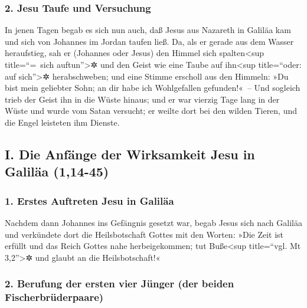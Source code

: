 \hypertarget{jesu-taufe-und-versuchung}{%
\subsubsection{2. Jesu Taufe und
Versuchung}\label{jesu-taufe-und-versuchung}}

 In jenen Tagen begab es sich nun auch, daß Jesus aus
Nazareth in Galiläa kam und sich von Johannes im Jordan taufen ließ.
 Da, als er gerade aus dem Wasser heraufstieg, sah er
(Johannes oder Jesus) den Himmel sich spalten\textless sup
title=``=~sich auftun''\textgreater✲ und den Geist wie eine Taube auf
ihn\textless sup title=``oder: auf sich''\textgreater✲ herabschweben;
 und eine Stimme erscholl aus den Himmeln: »Du bist mein
geliebter Sohn; an dir habe ich Wohlgefallen gefunden!«~--
 Und sogleich trieb der Geist ihn in die Wüste hinaus;
 und er war vierzig Tage lang in der Wüste und wurde vom
Satan versucht; er weilte dort bei den wilden Tieren, und die Engel
leisteten ihm Dienste.

\hypertarget{i.-die-anfuxe4nge-der-wirksamkeit-jesu-in-galiluxe4a-114-45}{%
\subsection{I. Die Anfänge der Wirksamkeit Jesu in Galiläa
(1,14-45)}\label{i.-die-anfuxe4nge-der-wirksamkeit-jesu-in-galiluxe4a-114-45}}

\hypertarget{erstes-auftreten-jesu-in-galiluxe4a}{%
\subsubsection{1. Erstes Auftreten Jesu in
Galiläa}\label{erstes-auftreten-jesu-in-galiluxe4a}}

 Nachdem dann Johannes ins Gefängnis gesetzt war, begab
Jesus sich nach Galiläa und verkündete dort die Heilsbotschaft Gottes
 mit den Worten: »Die Zeit ist erfüllt und das Reich
Gottes nahe herbeigekommen; tut Buße\textless sup title=``vgl. Mt
3,2''\textgreater✲ und glaubt an die Heilsbotschaft!«

\hypertarget{berufung-der-ersten-vier-juxfcnger-der-beiden-fischerbruxfcderpaare}{%
\subsubsection{2. Berufung der ersten vier Jünger (der beiden
Fischerbrüderpaare)}\label{berufung-der-ersten-vier-juxfcnger-der-beiden-fischerbruxfcderpaare}}

